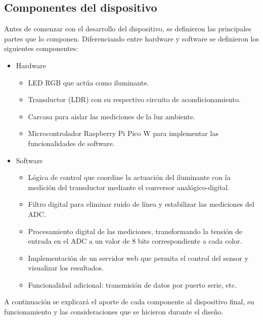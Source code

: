 \documentclass[12pt,a4paper,twoside,fleqn]{article}
\begin{document}
\subsection*{Componentes del dispositivo}
Antes de comenzar con el desarrollo del dispositivo, se definieron las principales partes que lo componen. Diferenciando entre hardware y software se definieron los siguientes componentes:
\begin{itemize}
    \item Hardware
    \begin{itemize}
        \item LED RGB que actúa como iluminante.
        \item Transductor (LDR) con su respectivo circuito de acondicionamiento.
        \item Carcasa para aislar las mediciones de la luz ambiente.
        \item Microcontrolador Raspberry Pi Pico W para implementar las funcionalidades de software.
    \end{itemize}
    \item Software
    \begin{itemize}
        \item Lógica de control que coordine la actuación del iluminante con la medición del transductor mediante el conversor analógico-digital.
        \item Filtro digital para eliminar ruido de línea y estabilizar las mediciones del ADC.
        \item Procesamiento digital de las mediciones, transformando la tensión de entrada en el ADC a un valor de 8 bits correspondiente a cada color.
        \item Implementación de un servidor web que permita el control del sensor y visualizar los resultados.
        \item Funcionalidad adicional: transmisión de datos por puerto serie, etc.
    \end{itemize}
\end{itemize}
A continuación se explicará el aporte de cada componente al dispositivo final, su funcionamiento y las consideraciones que se hicieron durante el diseño.
\end{document}
